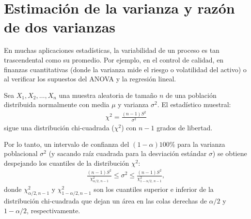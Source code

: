 \section{Estimación de la varianza y razón de dos varianzas}

En muchas aplicaciones estadísticas, la variabilidad de un proceso es tan trascendental como su promedio. Por ejemplo, en el control de calidad, en finanzas cuantitativas (donde la varianza mide el riesgo o volatilidad del activo) o al verificar los supuestos del ANOVA y la regresión lineal.

\begin{teorema}
	Sea $X_1, X_2, \ldots, X_n$ una muestra aleatoria de tamaño $n$ de una población distribuida normalmente con media $\mu$ y varianza $\sigma^2$. El estadístico muestral:
	\begin{align}
		\chi^2 = \frac{(n-1)S^2}{\sigma^2}
	\end{align}
	sigue una distribución chi-cuadrada ($\chi^2$) con $n-1$ grados de libertad.
	
	Por lo tanto, un intervalo de confianza del $(1-\alpha)100\%$ para la varianza poblacional $\sigma^2$ (y sacando raíz cuadrada para la desviación estándar $\sigma$) se obtiene despejando los cuantiles de la distribución $\chi^2$:
	\begin{align}
		\frac{(n-1)S^2}{\chi^2_{\alpha/2, \, n-1}} \leq \sigma^2 \leq \frac{(n-1)S^2}{\chi^2_{1-\alpha/2, \, n-1}},
	\end{align}
	donde $\chi^2_{\alpha/2, n-1}$ y $\chi^2_{1-\alpha/2, n-1}$ son los cuantiles superior e inferior de la distribución chi-cuadrada que dejan un área en las colas derechas de $\alpha/2$ y $1-\alpha/2$, respectivamente.
\end{teorema}

